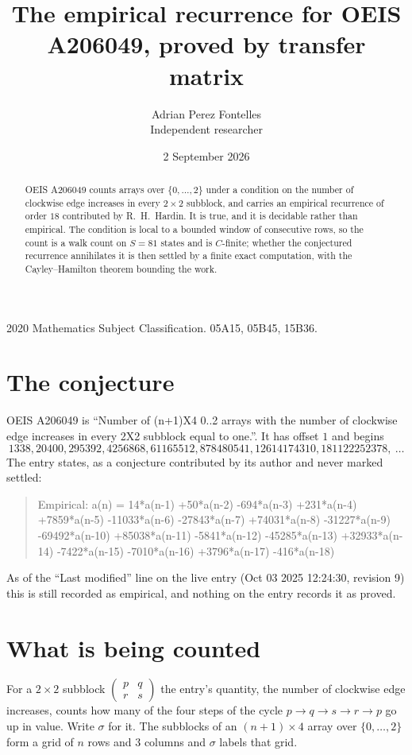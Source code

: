 \documentclass[11pt,a4paper]{article}
\title{The empirical recurrence for OEIS A206049, proved by transfer matrix}
\author{Adrian Perez Fontelles\\ \small Independent researcher}
\date{2 September 2026}
\theoremstyle{plain}
\theoremstyle{definition}
\begin{document}
\maketitle

\begin{abstract}
OEIS A206049 counts arrays over $\{0,\dots,2\}$ under a condition on the number of clockwise edge increases
in every $2\times2$ subblock, and carries an empirical recurrence of order $18$ contributed by
R.~H.~Hardin. It is true, and it is decidable rather than empirical. The condition is local to
a bounded window of consecutive rows, so the count is a walk count on $S=81$ states and is
$C$-finite; whether the conjectured recurrence annihilates it is then settled by a finite exact
computation, with the Cayley--Hamilton theorem bounding the work.
\end{abstract}

\noindent\small 2020 Mathematics Subject Classification. 05A15, 05B45, 15B36.\normalsize

\section{The conjecture}

OEIS A206049 is ``Number of (n+1)X4 0..2 arrays with the number of clockwise edge increases in every 2X2 subblock equal to one.''. It has offset $1$ and begins
\[
1338, 20400, 295392, 4256868, 61165512, 878480541, 12614174310, 181122252378,\ \dots
\]
The entry states, as a conjecture contributed by its author and never marked settled:
\begin{quote}
Empirical: a(n) = 14*a(n-1) +50*a(n-2) -694*a(n-3) +231*a(n-4) +7859*a(n-5) -11033*a(n-6) -27843*a(n-7) +74031*a(n-8) -31227*a(n-9) -69492*a(n-10) +85038*a(n-11) -5841*a(n-12) -45285*a(n-13) +32933*a(n-14) -7422*a(n-15) -7010*a(n-16) +3796*a(n-17) -416*a(n-18)
\end{quote}
As of the ``Last modified'' line on the live entry (Oct 03 2025 12:24:30, revision 9) this is still
recorded as empirical, and nothing on the entry records it as proved.

\section{What is being counted}

For a $2\times2$ subblock $\begin{pmatrix}p&q\\r&s\end{pmatrix}$ the
entry's quantity, the number of clockwise edge increases, counts how many of the four steps of the cycle $p\to q\to s\to r\to p$ go up in value. Write $\sigma$ for it. The subblocks of an
$(n+1)\times4$ array over $\{0,\dots,2\}$ form a grid of $n$ rows and $3$
columns and $\sigma$ labels that grid.
\end{document}
